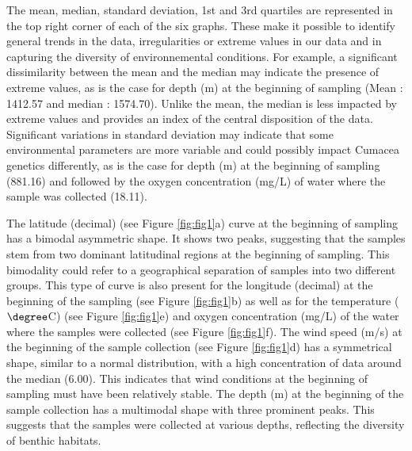 The mean, median, standard deviation, 1st and 3rd quartiles are represented in the top right corner of each of the six graphs. These make it possible to identify general trends in the data, irregularities or extreme values in our data and in capturing the diversity of environnemental conditions. For example, a significant dissimilarity between the mean and the median may indicate the presence of extreme values, as is the case for depth (m) at the beginning of sampling (Mean : 1412.57 and median : 1574.70). Unlike the mean, the median is less impacted by extreme values and provides an index of the central disposition of the data. Significant variations in standard deviation may indicate that some environmental parameters are more variable and could possibly impact Cumacea genetics differently, as is the case for depth (m) at the beginning of sampling (881.16) and followed by the oxygen concentration (mg/L) of water where the sample was collected (18.11). 

The latitude (decimal) (see Figure \ref{fig:fig1}a) curve at the beginning of sampling has a bimodal asymmetric shape. It shows two peaks, suggesting that the samples stem from two dominant latitudinal regions at the beginning of sampling. This bimodality could refer to a geographical separation of samples into two different groups. This type of curve is also present for the longitude (decimal) at the beginning of the sampling (see Figure \ref{fig:fig1}b) as well as for the temperature ($\degree$C) (see Figure \ref{fig:fig1}e) and oxygen concentration (mg/L) of the water where the samples were collected (see Figure \ref{fig:fig1}f). The wind speed (m/s) at the beginning of the sample collection (see Figure \ref{fig:fig1}d) has a symmetrical shape, similar to a normal distribution, with a high concentration of data around the median (6.00). This indicates that wind conditions at the beginning of sampling must have been relatively stable. The depth (m) at the beginning of the sample collection has a multimodal shape with three prominent peaks. This suggests that the samples were collected at various depths, reflecting the diversity of benthic habitats.

